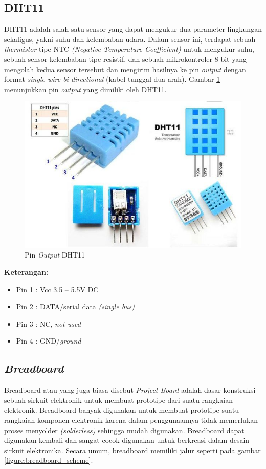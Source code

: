 \subsection{DHT11}
\tab DHT11 adalah salah satu sensor yang dapat mengukur dua parameter lingkungan sekaligus, yakni suhu dan kelembaban udara. Dalam sensor ini, terdapat sebuah \textit{thermistor} tipe NTC \textit{(Negative Temperature Coefficient)} untuk mengukur suhu, sebuah sensor kelembaban tipe resistif, dan sebuah mikrokontroler 8-bit yang mengolah kedua sensor tersebut dan mengirim hasilnya ke pin \textit{output} dengan format \textit{single-wire bi-directional} (kabel tunggal dua arah). Gambar \ref{figure:pinout-DHT11} menunjukkan pin \textit{output} yang dimiliki oleh DHT11.

\begin{figure}[H]
	\centerline {
		\includegraphics[width=\linewidth]{bab3/img/pinout-DHT11.jpg}
	}
	\caption{Pin \textit{Output} DHT11}
	\label{figure:pinout-DHT11}
\end{figure}

\textbf{Keterangan:}
\begin{itemize}
	\item Pin 1 : Vcc 3.5 – 5.5V DC
	\item Pin 2 : DATA/serial data \textit{(single bus)}
	\item Pin 3 : NC, \textit{not used}
	\item Pin 4 : GND/\textit{ground}
\end{itemize}


\subsection{\textit{Breadboard}}
\tab Breadboard atau yang juga biasa disebut \textit{Project Board} adalah dasar konstruksi sebuah sirkuit elektronik untuk membuat prototipe dari suatu rangkaian elektronik. Breadboard banyak digunakan untuk membuat prototipe suatu rangkaian komponen elektronik karena dalam penggunaannya tidak memerlukan proses menyolder \textit{(solderless)} sehingga mudah digunakan. Breadboard dapat digunakan kembali dan sangat cocok digunakan untuk berkreasi dalam desain sirkuit elektronika. Secara umum, breadboard memiliki jalur seperti pada gambar \ref{figure:breadboard_scheme}.

